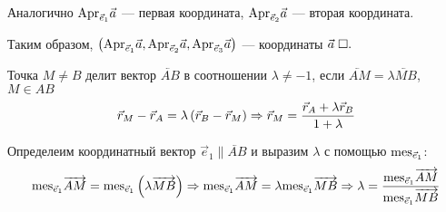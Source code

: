 \documentclass{article}
\begin{document}
Аналогично $\Apr_{\vec{e}_{1}}\vec{a}$ --- первая координата, $\Apr_{\vec{e}_{2}}\vec{a}$ --- вторая координата.

Таким образом, $\left(\Apr_{\vec{e}_{1}}\vec{a},\Apr_{\vec{e}_{2}}\vec{a},\Apr_{\vec{e}_{3}}\vec{a}\right)$ --- координаты $\vec{a}\qed$


Точка $M\neq B$ делит вектор $\lvec{AB}$ в соотношении $\lambda\neq -1$, если $\lvec{AM}=\lambda\lvec{MB}$, $M\in AB$
\begin{align*}
	\vec{r}_{M}-\vec{r}_{A}=\lambda\left(\vec{r}_{B}-\vec{r}_{M}\right)\Rarr \vec{r}_{M}=\frac{\vec{r}_{A}+\lambda\vec{r}_{B}}{1+\lambda}
\end{align*}

Определеим координатный вектор $\vec{e}_{1}\parallel\lvec{AB}$ и выразим $\lambda$ с помощью $\mes_{\vec{e}_{1}}$:
\begin{align*}
	\mes_{\vec{e}_{1}}\lvec{AM}=\mes_{\vec{e}_{1}}\left(\lambda\lvec{MB}\right)\Rarr
	\mes_{\vec{e}_{1}}\lvec{AM}=\lambda\mes_{\vec{e}_{1}}\lvec{MB}\Rarr
	\lambda=\frac{\mes_{\vec{e}_{1}}\lvec{AM}}{\mes_{\vec{e}_{1}}\lvec{MB}}
\end{align*}
\end{document}
